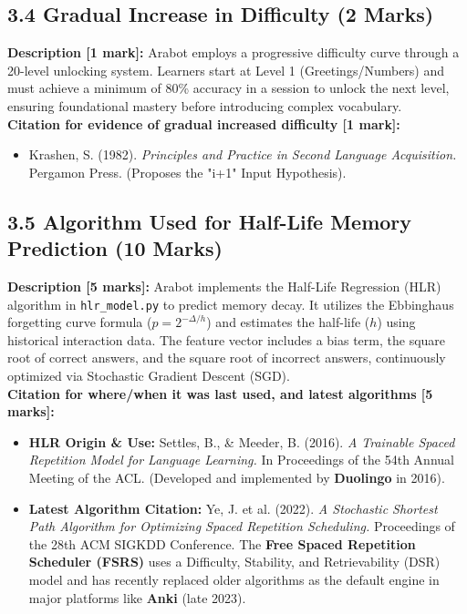 \documentclass[12pt,a4paper]{article}
\begin{document}
\subsection*{3.4 Gradual Increase in Difficulty (2 Marks)}
\textbf{Description [1 mark]:} Arabot employs a progressive difficulty curve through a 20-level unlocking system. Learners start at Level 1 (Greetings/Numbers) and must achieve a minimum of 80\% accuracy in a session to unlock the next level, ensuring foundational mastery before introducing complex vocabulary. \\
\textbf{Citation for evidence of gradual increased difficulty [1 mark]:}
\begin{itemize}[label={--}]
    \item Krashen, S. (1982). \textit{Principles and Practice in Second Language Acquisition.} Pergamon Press. (Proposes the "i+1" Input Hypothesis).
\end{itemize}

\subsection*{3.5 Algorithm Used for Half-Life Memory Prediction (10 Marks)}
\textbf{Description [5 marks]:} Arabot implements the Half-Life Regression (HLR) algorithm in \texttt{hlr\_model.py} to predict memory decay. It utilizes the Ebbinghaus forgetting curve formula ($p = 2^{-\Delta/h}$) and estimates the half-life ($h$) using historical interaction data. The feature vector includes a bias term, the square root of correct answers, and the square root of incorrect answers, continuously optimized via Stochastic Gradient Descent (SGD). \\
\textbf{Citation for where/when it was last used, and latest algorithms [5 marks]:}
\begin{itemize}[label={--}]
    \item \textbf{HLR Origin \& Use:} Settles, B., \& Meeder, B. (2016). \textit{A Trainable Spaced Repetition Model for Language Learning.} In Proceedings of the 54th Annual Meeting of the ACL. (Developed and implemented by \textbf{Duolingo} in 2016).
    \item \textbf{Latest Algorithm Citation:} Ye, J. et al. (2022). \textit{A Stochastic Shortest Path Algorithm for Optimizing Spaced Repetition Scheduling.} Proceedings of the 28th ACM SIGKDD Conference. The \textbf{Free Spaced Repetition Scheduler (FSRS)} uses a Difficulty, Stability, and Retrievability (DSR) model and has recently replaced older algorithms as the default engine in major platforms like \textbf{Anki} (late 2023).
\end{itemize}
\end{document}
